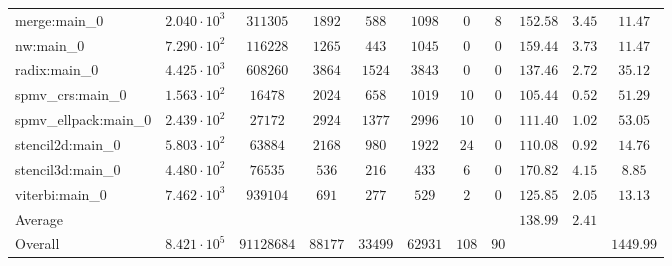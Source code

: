 \begin{tabular}{|l|c|c|c|c|c|c|c|c|c|c|}
merge:main\_0          & $ 2.040 \cdot 10^{3} $ & $ 311305   $ & $ 1892  $ & $ 588   $ & $ 1098  $ & $ 0   $ & $ 8  $ & $ 152.58      $ & $ 3.45    $ & $ 11.47   $ \\
nw:main\_0             & $ 7.290 \cdot 10^{2} $ & $ 116228   $ & $ 1265  $ & $ 443   $ & $ 1045  $ & $ 0   $ & $ 0  $ & $ 159.44      $ & $ 3.73    $ & $ 11.47   $ \\
radix:main\_0          & $ 4.425 \cdot 10^{3} $ & $ 608260   $ & $ 3864  $ & $ 1524  $ & $ 3843  $ & $ 0   $ & $ 0  $ & $ 137.46      $ & $ 2.72    $ & $ 35.12   $ \\
spmv\_crs:main\_0      & $ 1.563 \cdot 10^{2} $ & $ 16478    $ & $ 2024  $ & $ 658   $ & $ 1019  $ & $ 10  $ & $ 0  $ & $ 105.44      $ & $ 0.52    $ & $ 51.29   $ \\
spmv\_ellpack:main\_0  & $ 2.439 \cdot 10^{2} $ & $ 27172    $ & $ 2924  $ & $ 1377  $ & $ 2996  $ & $ 10  $ & $ 0  $ & $ 111.40      $ & $ 1.02    $ & $ 53.05   $ \\
stencil2d:main\_0      & $ 5.803 \cdot 10^{2} $ & $ 63884    $ & $ 2168  $ & $ 980   $ & $ 1922  $ & $ 24  $ & $ 0  $ & $ 110.08      $ & $ 0.92    $ & $ 14.76   $ \\
stencil3d:main\_0      & $ 4.480 \cdot 10^{2} $ & $ 76535    $ & $ 536   $ & $ 216   $ & $ 433   $ & $ 6   $ & $ 0  $ & $ 170.82      $ & $ 4.15    $ & $ 8.85    $ \\
viterbi:main\_0        & $ 7.462 \cdot 10^{3} $ & $ 939104   $ & $ 691   $ & $ 277   $ & $ 529   $ & $ 2   $ & $ 0  $ & $ 125.85      $ & $ 2.05    $ & $ 13.13   $ \\
\hline
Average                & $                    $ & $          $ & $       $ & $       $ & $       $ & $     $ & $    $ & $ 138.99      $ & $ 2.41    $ & $         $ \\
\hline
Overall                & $ 8.421 \cdot 10^{5} $ & $ 91128684 $ & $ 88177 $ & $ 33499 $ & $ 62931 $ & $ 108 $ & $ 90 $ & $             $ & $         $ & $ 1449.99 $ \\
\hline
\end{tabular}
